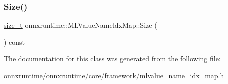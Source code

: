 \mbox{\label{classonnxruntime_1_1MLValueNameIdxMap_a328bff93d67f36db0019362bcccff58f}} 
\subsubsection{\texorpdfstring{Size()}{Size()}}
{\footnotesize\ttfamily \mbox{\hyperlink{mlasi_8h_a503efbc1c6e50825320ad909366b78ab}{size\+\_\+t}} onnxruntime\+::\+M\+L\+Value\+Name\+Idx\+Map\+::\+Size (\begin{DoxyParamCaption}{ }\end{DoxyParamCaption}) const\hspace{0.3cm}{\ttfamily [inline]}}



The documentation for this class was generated from the following file\+:\begin{DoxyCompactItemize}
\item 
onnxruntime/onnxruntime/core/framework/\mbox{\hyperlink{mlvalue__name__idx__map_8h}{mlvalue\+\_\+name\+\_\+idx\+\_\+map.\+h}}\end{DoxyCompactItemize}
